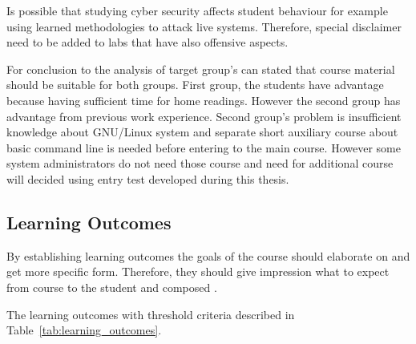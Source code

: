 Is possible that studying cyber security affects student behaviour for example using learned methodologies to attack live systems. Therefore, special disclaimer need to be added to labs that have also offensive aspects.
 
For conclusion to the analysis of target group's can stated that course material should be suitable for both groups. First group, the students have advantage because having sufficient time for home readings. However the second group has advantage from previous work experience. Second group's problem is insufficient knowledge about GNU/Linux system and separate short auxiliary course about basic command line is needed before entering to the main course. However some system administrators do not need those course and need for additional course will decided using entry test developed during this thesis.


\subsection{Learning Outcomes}

By establishing learning outcomes the goals of the course should elaborate on and get more specific form. Therefore, they should give impression what to expect from course to the student and composed  \citep[p.~7]{OppeArenduskeskus2010}.

The learning outcomes with threshold criteria described in Table~\ref{tab:learning_outcomes}.


